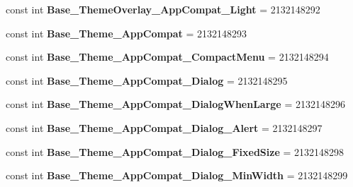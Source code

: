 \begin{DoxyCompactItemize}
\mbox{\label{classst_delivery_1_1_resource_1_1_style_a36e51eeb7f3ac1c58b797ae705db950f}} 
const int {\bfseries Base\+\_\+\+Theme\+Overlay\+\_\+\+App\+Compat\+\_\+\+Light} = 2132148292
\item 
\mbox{\label{classst_delivery_1_1_resource_1_1_style_a08a92417f72a67c4616093a35d552db8}} 
const int {\bfseries Base\+\_\+\+Theme\+\_\+\+App\+Compat} = 2132148293
\item 
\mbox{\label{classst_delivery_1_1_resource_1_1_style_a5fdb045f21fca25182572f93a8ac2613}} 
const int {\bfseries Base\+\_\+\+Theme\+\_\+\+App\+Compat\+\_\+\+Compact\+Menu} = 2132148294
\item 
\mbox{\label{classst_delivery_1_1_resource_1_1_style_ab4e5d8f3fc57f7211a794fa0cc5d83e6}} 
const int {\bfseries Base\+\_\+\+Theme\+\_\+\+App\+Compat\+\_\+\+Dialog} = 2132148295
\item 
\mbox{\label{classst_delivery_1_1_resource_1_1_style_a0b3bf24cf568349b0c31e235ff2621c8}} 
const int {\bfseries Base\+\_\+\+Theme\+\_\+\+App\+Compat\+\_\+\+Dialog\+When\+Large} = 2132148296
\item 
\mbox{\label{classst_delivery_1_1_resource_1_1_style_abf6af23e0e259650bb31dca79b291c8a}} 
const int {\bfseries Base\+\_\+\+Theme\+\_\+\+App\+Compat\+\_\+\+Dialog\+\_\+\+Alert} = 2132148297
\item 
\mbox{\label{classst_delivery_1_1_resource_1_1_style_a6d419c8de3855fa48adc01f8b831d696}} 
const int {\bfseries Base\+\_\+\+Theme\+\_\+\+App\+Compat\+\_\+\+Dialog\+\_\+\+Fixed\+Size} = 2132148298
\item 
\mbox{\label{classst_delivery_1_1_resource_1_1_style_a9a947903ab47e280fe6905f95ba5b3ff}} 
const int {\bfseries Base\+\_\+\+Theme\+\_\+\+App\+Compat\+\_\+\+Dialog\+\_\+\+Min\+Width} = 2132148299
\item 
\mbox{\label{classst_delivery_1_1_resource_1_1_style_ad6f013563ede0f99ef34fe5bc326b391}} 

\end{DoxyCompactItemize}

